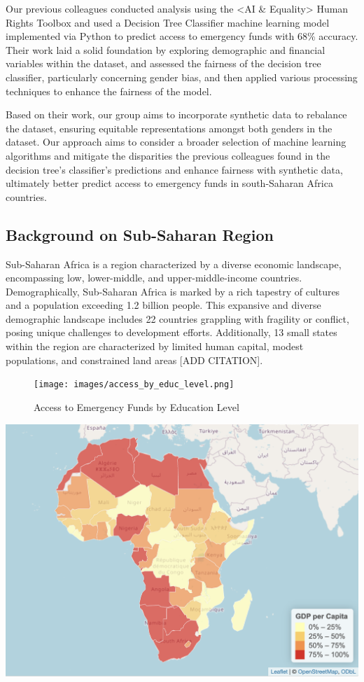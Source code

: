 \documentclass[12pt]{article}
\begin{document}
Our previous colleagues conducted analysis using the \textless AI \&
Equality\textgreater{} Human Rights Toolbox and used a Decision Tree
Classifier machine learning model implemented via Python to predict
access to emergency funds with 68\% accuracy. Their work laid a solid
foundation by exploring demographic and financial variables within the
dataset, and assessed the fairness of the decision tree classifier,
particularly concerning gender bias, and then applied various processing
techniques to enhance the fairness of the model\citep{Porta2022}.

Based on their work, our group aims to incorporate synthetic data to
rebalance the dataset, ensuring equitable representations amongst both
genders in the dataset. Our approach aims to consider a broader
selection of machine learning algorithms and mitigate the disparities
the previous colleagues found in the decision tree's classifier's
predictions and enhance fairness with synthetic data, ultimately better
predict access to emergency funds in south-Saharan Africa
countries\citep{SyntheticDataAIEquality}.

\hypertarget{background-on-sub-saharan-region}{%
\subsection{Background on Sub-Saharan
Region}\label{background-on-sub-saharan-region}}

Sub-Saharan Africa is a region characterized by a diverse economic
landscape, encompassing low, lower-middle, and upper-middle-income
countries. Demographically, Sub-Saharan Africa is marked by a rich
tapestry of cultures and a population exceeding 1.2 billion people. This
expansive and diverse demographic landscape includes 22 countries
grappling with fragility or conflict, posing unique challenges to
development efforts. Additionally, 13 small states within the region are
characterized by limited human capital, modest populations, and
constrained land areas {[}ADD CITATION{]}.

\begin{figure}
\centering
\texttt{[image: images/access\_by\_educ\_level.png]}
\caption{Access to Emergency Funds by Education Level}
\end{figure}

\begin{center}\includegraphics[width=0.7\linewidth]{graphs/map} \end{center}
\end{document}
